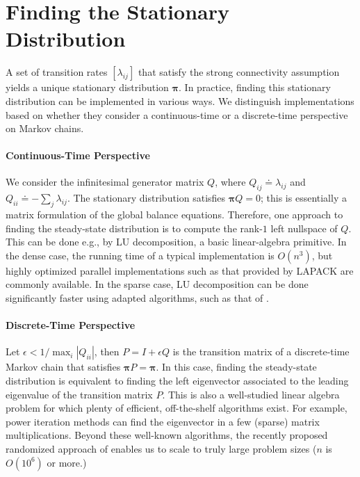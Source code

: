 \section{Finding the Stationary Distribution}

A set of transition rates $[\lambda_{ij}]$ that satisfy the strong connectivity assumption yields a unique stationary distribution $\bm{\pi}$.
In practice, finding this stationary distribution can be implemented in various ways.
We distinguish implementations based on whether they consider a continuous-time or a discrete-time perspective on Markov chains.

\paragraph{Continuous-Time Perspective}
We consider the infinitesimal generator matrix $Q$, where $Q_{ij} \doteq \lambda_{ij}$ and $Q_{ii} \doteq - \sum_{j} \lambda_{ij}$.
The stationary distribution satisfies $\bm{\pi} Q = 0$; this is essentially a matrix formulation of the global balance equations.
Therefore, one approach to finding the steady-state distribution is to compute the rank-$1$ left nullspace of $Q$.
This can be done e.g., by LU decomposition, a basic linear-algebra primitive.
In the dense case, the running time of a typical implementation is $O(n^3)$, but highly optimized parallel implementations such as that provided by LAPACK \citep{anderson1999lapack} are commonly available.
In the sparse case, LU decomposition can be done significantly faster using adapted algorithms, such as that of \citet{demmel1999supernodal}.

\paragraph{Discrete-Time Perspective}
Let $\epsilon < 1 / \max_i |Q_{ii}|$, then $P = I + \epsilon Q$ is the transition matrix of a discrete-time Markov chain that satisfies $\bm{\pi} P = \bm{\pi}$.
In this case, finding the steady-state distribution is equivalent to finding the left eigenvector associated to the leading eigenvalue of the transition matrix $P$.
This is also a well-studied linear algebra problem for which plenty of efficient, off-the-shelf algorithms exist.
For example, power iteration methods can find the eigenvector in a few (sparse) matrix multiplications.
Beyond these well-known algorithms, the recently proposed randomized approach of \citet{halko2011finding} enables us to scale to truly large problem sizes ($n$ is $O(10^6)$ or more.)

